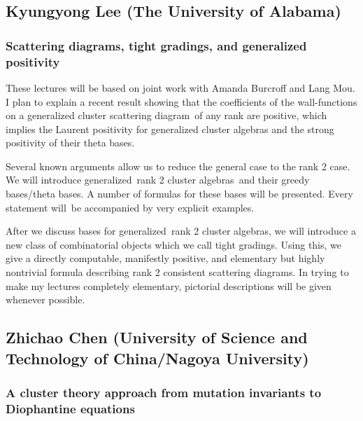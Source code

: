 \documentclass[
]{article}
\begin{document}
\subsection*{Kyungyong Lee (The University of
Alabama)}\label{kyungyong-lee-the-university-of-alabama}

\subsubsection*{Scattering diagrams, tight gradings, and generalized
positivity}\label{scattering-diagrams-tight-gradings-and-generalized-positivity}

These lectures will be based on joint work with Amanda Burcroff and Lang
Mou. I plan to explain a recent result showing that the coefficients of
the wall-functions on a generalized cluster scattering diagram~of any
rank are positive, which implies the Laurent positivity for generalized
cluster algebras and the strong positivity of their theta bases.

Several known arguments allow us to reduce the general case to the rank
2 case. We will introduce generalized~rank 2 cluster algebras~and their
greedy bases/theta bases. A number of formulas for these bases will be
presented. Every statement will~be accompanied by very explicit
examples.

After we discuss bases for generalized~rank 2 cluster algebras, we will
introduce a new class of combinatorial objects which we call tight
gradings. Using this, we give a directly computable, manifestly
positive, and elementary but highly nontrivial formula describing rank 2
consistent scattering diagrams. In trying to make my lectures completely
elementary, pictorial descriptions will be given whenever possible.

\subsection*{Zhichao Chen (University of Science and Technology of
China/Nagoya
University)}\label{zhichao-chen-university-of-science-and-technology-of-chinanagoya-university}

\subsubsection*{A cluster theory approach from mutation invariants to
Diophantine
equations}\label{a-cluster-theory-approach-from-mutation-invariants-to-diophantine-equations}
\end{document}
